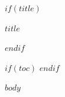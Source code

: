 \documentclass[12pt,a4paper]{article}
\begin{document}
$if(title)$
\begin{center}
    {\LARGE \sffamily\bfseries $title$}
\end{center}
\vspace{1em}
$endif$

$if(toc)$
\tableofcontents
\newpage
$endif$

$body$
\end{document}
